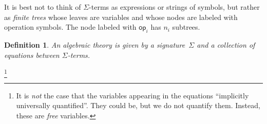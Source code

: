 \documentclass{amsart}
\newcommand{\op}{\mathsf{op}}
\newtheorem{definition}{Definition}
\begin{document}
It is best not to think of $\Sigma$-terms as expressions or strings of symbols, but rather
as \emph{finite trees} whose leaves are variables and whose nodes are labeled with operation
symbols. The node labeled with $\op_i$ has $n_i$ subtrees.

\begin{definition}
  An \emph{algebraic theory} is given by a signature~$\Sigma$ and a collection of equations
  between $\Sigma$-terms.
\end{definition}




\footnote{It is \emph{not} the case that the variables appearing
  in the equations ``implicitly universally quantified''. They could be, but we do not
  quantify them. Instead, these are \emph{free} variables.}
\end{document}
